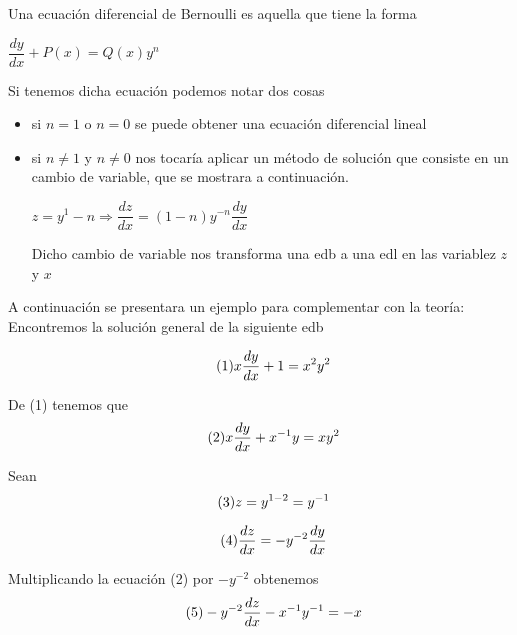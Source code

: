 \documentclass[10pt,a4paper]{article}
\begin{document}
  Una ecuación diferencial de Bernoulli es aquella que tiene la forma\\
\begin{center}
$\dfrac{dy}{dx}+P(x)=Q(x)y^n$
\end{center}
Si tenemos dicha ecuación podemos notar dos cosas
\begin{itemize}
\item si $n=1$ o $n=0$ se puede obtener una ecuación diferencial lineal\\
\item si $n\neq1$ y $n\neq0$ nos tocaría aplicar un método de solución que consiste en un cambio de variable, que se mostrara a continuación.\\
\begin{center}
 $z=y^1-n\Rightarrow\dfrac{dz}{dx}=(1-n)y^{-n}\dfrac{dy}{dx}$\\
  
\end{center}
Dicho cambio de variable nos transforma una edb a una edl en las variablez $z$ y $x$\\

\end{itemize}
A continuación se presentara un ejemplo para complementar con la teoría:\\
Encontremos la solución general de la siguiente edb

\begin{equation}\tag{1}
x\dfrac{dy}{dx}+1=x^2y^2\\
\end{equation}

De (1) tenemos que
\begin{equation}\tag{2}
x\dfrac{dy}{dx}+x^{-1}y=xy^2\\
\end{equation}

Sean
\begin{equation}\tag{3}
z=y^{1-2}=y^{-1}\\
\end{equation}

\begin{equation}\tag{4}
\dfrac{dz}{dx}=-y^{-2}\dfrac{dy}{dx}\\
\end{equation}

Multiplicando la ecuación (2) por $-y^{-2}$ obtenemos
\begin{equation}\tag{5}
-y^{-2}\dfrac{dz}{dx}-x^{-1}y^{-1}=-x\\
\end{equation}
\end{document}
